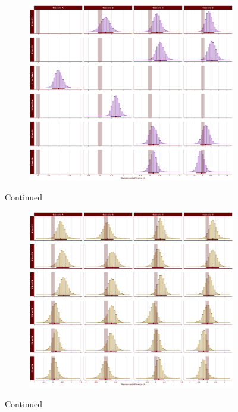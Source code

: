 \begin{appendix}
\begin{figure}[ht]\ContinuedFloat
    \centering
    \begin{subfigure}{1\textwidth}
        \includegraphics[width=\linewidth]{Figures/SD2_proportion_scenario_comparisons_B.png}
        \label{fig:proportion-scenario-comparisons-B}
    \end{subfigure}
    \caption[]{Continued}
\end{figure}

\medskip

\begin{figure}[ht]\ContinuedFloat
    \centering
    \begin{subfigure}{1\textwidth}
        \includegraphics[width=\linewidth]{Figures/SD2_proportion_scenario_comparisons_C.png}
        \label{fig:proportion-scenario-comparisons-C}
    \end{subfigure}
    \caption[]{Continued}
\end{figure}


\end{appendix}
